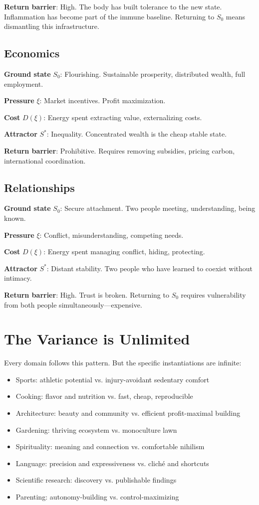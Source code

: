 \documentclass[12pt]{article}
\theoremstyle{definition}
\theoremstyle{remark}
\begin{document}
\textbf{Return barrier}: High. The body has built tolerance to the new state. Inflammation has become part of the immune baseline. Returning to $S_0$ means dismantling this infrastructure.

\subsection{Economics}

\textbf{Ground state} $S_0$: Flourishing. Sustainable prosperity, distributed wealth, full employment.

\textbf{Pressure} $\xi$: Market incentives. Profit maximization.

\textbf{Cost} $D(\xi)$: Energy spent extracting value, externalizing costs.

\textbf{Attractor} $S^*$: Inequality. Concentrated wealth is the cheap stable state.

\textbf{Return barrier}: Prohibitive. Requires removing subsidies, pricing carbon, international coordination.

\subsection{Relationships}

\textbf{Ground state} $S_0$: Secure attachment. Two people meeting, understanding, being known.

\textbf{Pressure} $\xi$: Conflict, misunderstanding, competing needs.

\textbf{Cost} $D(\xi)$: Energy spent managing conflict, hiding, protecting.

\textbf{Attractor} $S^*$: Distant stability. Two people who have learned to coexist without intimacy.

\textbf{Return barrier}: High. Trust is broken. Returning to $S_0$ requires vulnerability from both people simultaneously—expensive.

\section{The Variance is Unlimited}

Every domain follows this pattern. But the specific instantiations are infinite:

\begin{itemize}
\item Sports: athletic potential vs. injury-avoidant sedentary comfort
\item Cooking: flavor and nutrition vs. fast, cheap, reproducible
\item Architecture: beauty and community vs. efficient profit-maximal building
\item Gardening: thriving ecosystem vs. monoculture lawn
\item Spirituality: meaning and connection vs. comfortable nihilism
\item Language: precision and expressiveness vs. cliché and shortcuts
\item Scientific research: discovery vs. publishable findings
\item Parenting: autonomy-building vs. control-maximizing
\end{itemize}
\end{document}
